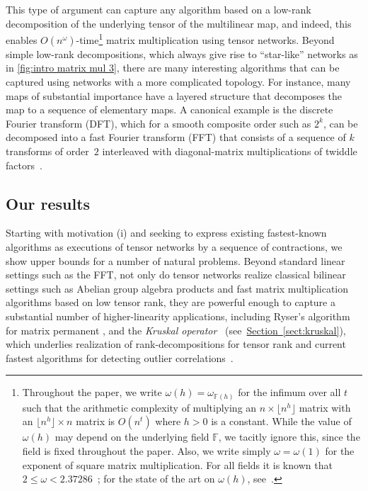\documentclass[11pt]{article}
\numberwithin{equation}{section}
\theoremstyle{definition}
\theoremstyle{plain}
\newcommand{\expref}[2]{\hyperref[#2]{#1~\ref{#2}}}
\newcommand{\F}{\ensuremath{\mathbb{F}}}
\begin{document}
This type of argument can capture any algorithm based on a low-rank
decomposition of the underlying tensor of the multilinear map, and
indeed, this enables $O(n^\omega)$-time\footnote{Throughout the paper,
we write  
%
%
  $\omega(h) = \omega_{\F(h)}$    %
for the infimum over all $t$
such that the arithmetic complexity of multiplying an
$n \times \lfloor n^h\rfloor$ matrix with an $\lfloor n^h\rfloor\times n$
matrix is $O(n^t)$ where $h>0$ is a constant.
While the value of $\omega(h)$ may depend on the underlying
field $\F$, we tacitly ignore this, since the field is fixed throughout
the paper. Also, we write simply $\omega=\omega(1)$ for the exponent
of square matrix multiplication. For all fields it is known that
$2\leq\omega<2.37286$~\cite{AlmanVW2021,LeGall2014,VassilevskaWilliams2012};
for the state of the art on $\omega(h)$,
%
see~\cite{LeGallU2017}.}{} %
 matrix multiplication
using tensor networks.
Beyond simple low-rank decompositions, which always give rise to
``star-like'' networks as in \eqref{fig:intro matrix mul 3}, there are
many interesting algorithms that can be captured using networks with a
more complicated topology.
For instance, many maps of substantial
importance have a layered structure that decomposes the map to a sequence
of elementary maps. A canonical example is the
discrete Fourier transform (DFT),
which for a smooth composite order such as $2^k$, can be decomposed
into a fast Fourier transform (FFT) that consists of a sequence
of $k$ transforms of order~$2$ interleaved with diagonal-matrix
multiplications of twiddle factors~\cite{CooleyT1965,VanLoan1992}.

\subsection{Our results}
\label{sect:our}

Starting with motivation (i) and seeking to express existing fastest-known
algorithms
as executions of tensor networks by a sequence of contractions,
we show upper bounds for a number of
natural problems. Beyond standard linear settings such as the FFT,
not only do tensor networks realize classical bilinear settings
such as Abelian group algebra products and
fast matrix multiplication algorithms based on low tensor rank,
they are powerful enough to capture a substantial number of higher-linearity
applications, including Ryser's algorithm for matrix permanent \cite{Ryser1963},
and the \emph{Kruskal operator}~\cite{Kolda2006,Kruskal1977}
(see~\expref{Section}{sect:kruskal}), %
which underlies realization of rank-decompositions for tensor rank
\cite{Kolda2009} and current fastest algorithms for detecting outlier
correlations~\cite{KarppaKK2018}.
\end{document}
